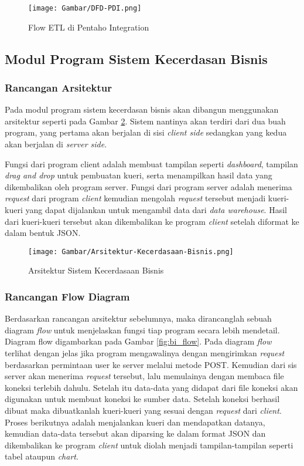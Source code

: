 \begin{figure}[H]
	\centering
	\texttt{[image: Gambar/DFD-PDI.png]}
	\caption[Flow ETL di Pentaho Integration]{Flow ETL di Pentaho Integration} 
	\label{fig:dfd_pdi}
\end{figure}

\subsection{Modul Program Sistem Kecerdasan Bisnis}
\subsubsection{Rancangan Arsitektur}
Pada modul program sistem kecerdasan bisnis akan dibangun menggunakan arsitektur seperti pada Gambar \ref{fig:bi_arsitektur}. Sistem nantinya akan terdiri dari dua buah program, yang pertama akan berjalan di sisi \textit{client side} sedangkan yang kedua akan berjalan di \textit{server side}. 

Fungsi dari program client adalah membuat tampilan seperti \textit{dashboard}, tampilan \textit{drag and drop} untuk pembuatan kueri, serta menampilkan hasil data yang dikembalikan oleh program server. Fungsi dari program server adalah menerima \textit{request} dari program \textit{client} kemudian mengolah \textit{request} tersebut menjadi kueri-kueri yang dapat dijalankan untuk mengambil data dari \textit{data warehouse}. Hasil dari kueri-kueri tersebut akan dikembalikan ke program \textit{client} setelah diformat ke dalam bentuk JSON.

\begin{figure}[H]
	\centering
	\texttt{[image: Gambar/Arsitektur-Kecerdasaan-Bisnis.png]}
	\caption[Arsitektur Sistem Kecerdasaan Bisnis]{Arsitektur Sistem Kecerdasaan Bisnis} 
	\label{fig:bi_arsitektur}
\end{figure}

\subsubsection{Rancangan Flow Diagram}
Berdasarkan rancangan arsitektur sebelumnya, maka dirancanglah sebuah diagram \textit{flow} untuk menjelaskan fungsi tiap program secara lebih mendetail. Diagram flow digambarkan pada Gambar \ref{fig:bi_flow}. Pada diagram \textit{flow} terlihat dengan jelas jika program mengawalinya dengan mengirimkan \textit{request} berdasarkan permintaan user ke server melalui metode POST. Kemudian dari sis server akan menerima \textit{request} tersebut, lalu memulainya dengan membaca file koneksi terlebih dahulu. Setelah itu data-data yang didapat dari file koneksi akan digunakan untuk membuat koneksi ke sumber data. Setelah koneksi berhasil dibuat maka dibuatkanlah kueri-kueri yang sesuai dengan \textit{request} dari \textit{client}. Proses berikutnya adalah menjalankan kueri dan mendapatkan datanya, kemudian data-data tersebut akan diparsing ke dalam format JSON dan dikembalikan ke program \textit{client} untuk diolah menjadi tampilan-tampilan seperti tabel ataupun \textit{chart}.


